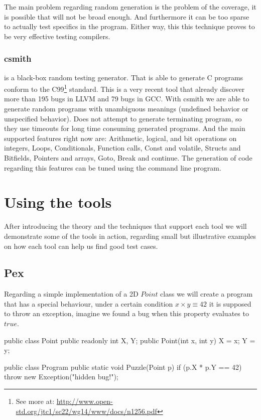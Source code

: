 \documentclass[10pt, conference, compsocconf]{IEEEtran}
\begin{document}
The main problem regarding random generation is the problem of the coverage, it is possible that will not be broad enough. And furthermore it can be
too sparse to actually test specifics in the program. Either way, this this technique proves to be very effective testing compilers.

\subsubsection{\textbf{csmith}\cite{Yang:2011:FUB:1993316.1993532}} is a black-box random testing generator. That is able to generate C programs
conform to the C99\footnote{See more at: \url{http://www.open-std.org/jtc1/sc22/wg14/www/docs/n1256.pdf}} standard. This is a very recent tool that already discover
more than 195 bugs in LLVM and 79 bugs in GCC. With csmith we are able to generate random programs with unambiguous meanings (undefined behavior or 
unspecified behavior). Does not attempt to generate terminating program, so they use timeouts for long time consuming generated programs.
And the main supported features right now are: Arithmetic, logical, and bit operations on integers, Loops, Conditionals, Function calls, Const and volatile,
Structs and Bitfields, Pointers and arrays, Goto, Break and continue. The generation of code regarding this features can be tuned using the command line program.

\section{Using the tools}
After introducing the theory and the techniques that support each tool we will demonstrate some of the tools in action, regarding small but illustrative examples
on how each tool can help us find good test cases.

\subsection{Pex}
Regarding a simple implementation of a 2D $Point$ class we will create a program that has a special behaviour, under a certain condition
$x \times y \equiv 42$ it is supposed to throw an exception, imagine we found a bug when this property evaluates to $true$.

\begin{code}
public class Point  {
  public readonly int X, Y;
  public Point(int x, int y) { X = x; Y = y; }
}

public class Program {
  public static void Puzzle(Point p) {
    if (p.X * p.Y == 42)
        throw new Exception("hidden bug!");
  }
}
\end{code}
\end{document}
